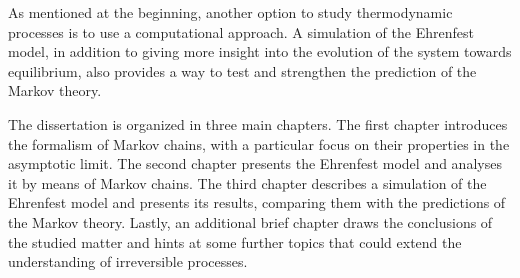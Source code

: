 As mentioned at the beginning, another option to study thermodynamic processes is to use a computational approach. A simulation of the Ehrenfest model, in addition to giving more insight into the evolution of the system towards equilibrium, also provides a way to test and strengthen the prediction of the Markov theory.

The dissertation is organized in three main chapters. The first chapter introduces the formalism of Markov chains, with a particular focus on their properties in the asymptotic limit. The second chapter presents the Ehrenfest model and analyses it by means of Markov chains. The third chapter describes a simulation of the Ehrenfest model and presents its results, comparing them with the predictions of the Markov theory. Lastly, an additional brief chapter draws the conclusions of the studied matter and hints at some further topics that could extend the understanding of irreversible processes.